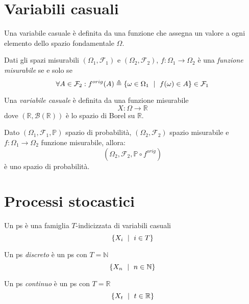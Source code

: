 \section{Variabili casuali}

Una variabile casuale è definita da una funzione che assegna un valore a ogni elemento dello spazio fondamentale $\Omega$.

\begin{mtdef}
	Dati gli spazi misurabili $(\Omega_1,\mathcal{F}_1)$ e $(\Omega_2,\mathcal{F}_2)$, $f:\Omega_1 \rightarrow \Omega_2$ è una \emph{funzione misurabile} se e solo se
	$$ \forall A \in \mathcal{F}_2 : f^{orig}(A) \triangleq \{\omega \in \Omega_1 \mbox{ }\mid\mbox{ } f(\omega) \in A \} \in \mathcal{F}_1 $$
\end{mtdef}

\begin{mtdef}
	Una \emph{variabile casuale} è definita da una funzione misurabile
	$$ X : \Omega \rightarrow \mathbb{R} $$
	dove $(\mathbb{R},\mathcal{B}(\mathbb{R}))$ è lo spazio di Borel su $\mathbb{R}$.
\end{mtdef}

\begin{mtpro}
	Dato $(\Omega_1,\mathcal{F}_1,\mathbb{P})$ spazio di probabilità, $(\Omega_2,\mathcal{F}_2)$ spazio misurabile e $f:\Omega_1 \rightarrow \Omega_2$ funzione misurabile, allora:
	$$ (\Omega_2, \mathcal{F}_2, \mathbb{P} \circ f^{orig}) $$
	è uno spazio di probabilità.
\end{mtpro}

\section{Processi stocastici}

\begin{mtdef}[\ac{ps}]
	Un \ac{ps} è una famiglia $T$-indicizzata di variabili casuali
	$$ \{X_i \mbox{ }\mid\mbox{ } i \in T\} $$
\end{mtdef}

\begin{mtdef}[\ac{ps} discreto]
	Un \ac{ps} \emph{discreto} è un \ac{ps} con $T = \mathbb{N}$
	$$ \{X_n \mbox{ }\mid\mbox{ } n \in \mathbb{N}\} $$
\end{mtdef}

\begin{mtdef}[\ac{ps} continuo]
	Un \ac{ps} \emph{continuo} è un \ac{ps} con $T = \mathbb{R}$
	$$ \{X_t \mbox{ }\mid\mbox{ } t \in \mathbb{R}\} $$
\end{mtdef}

